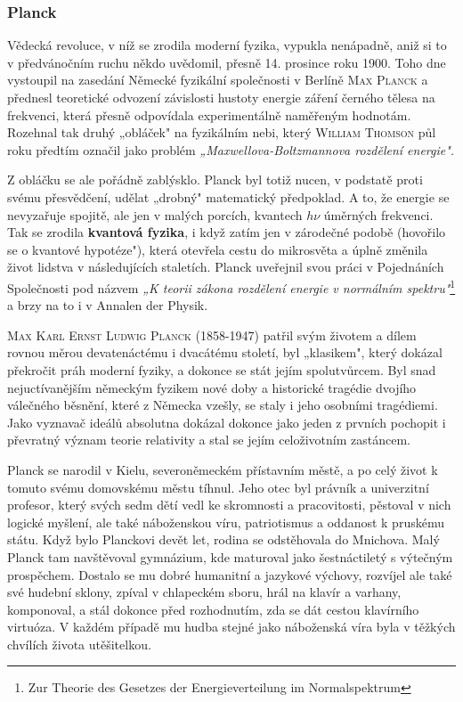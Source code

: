       \subsubsection{Planck}\label{fyz:IchapIIsecIVssecIsssecVI}
        Vědecká revoluce, v níž se zrodila moderní fyzika, vypukla nenápadně, aniž si to v
        předvánočním ruchu někdo uvědomil, přesně 14. prosince roku 1900. Toho dne vystoupil na
        zasedání Německé fyzikální společnosti v Berlíně \textsc{Max Planck} a přednesl teoretické
        odvození závislosti hustoty energie záření černého tělesa na frekvenci, která přesně
        odpovídala experimentálně naměřeným hodnotám. Rozehnal tak druhý „obláček" na fyzikálním
        nebi, který \textsc{William Thomson} půl roku předtím označil jako problém
        \emph{„Maxwellova-Boltzmannova rozdělení energie".}

        Z obláčku se ale pořádně zablýsklo. Planck byl totiž nucen, v podstatě proti svému
        přesvědčení, udělat „drobný" matematický předpoklad. A to, že energie se nevyzařuje spojitě,
        ale jen v malých porcích, kvantech \(h\nu\) úměrných frekvenci. Tak se zrodila
        \textbf{kvantová fyzika}, i když zatím jen v zárodečné podobě (hovořilo se o kvantové
        hypotéze"), která otevřela cestu do mikrosvěta a úplně změnila život lidstva v následujících
        staletích. Planck uveřejnil svou práci v Pojednáních Společnosti pod názvem \emph{„K teorii
        zákona rozdělení energie v normálním spektru"}\footnote{\foreignlanguage{ngerman}{Zur
        Theorie des Gesetzes der Energieverteilung im Normalspektrum}} a brzy na to i v Annalen der
        Physik.

        \textsc{Max Karl Ernst Ludwig Planck} (1858-1947) patřil svým životem a dílem rovnou měrou
        devatenáctému i dvacátému století, byl „klasikem", který dokázal překročit práh moderní
        fyziky, a dokonce se stát jejím spolutvůrcem. Byl snad nejuctívanějším německým fyzikem nové
        doby a historické tragédie dvojího válečného běsnění, které z Německa vzešly, se staly i
        jeho osobními tragédiemi. Jako vyznavač ideálů absolutna dokázal dokonce jako jeden z
        prvních pochopit i převratný význam teorie relativity a stal se jejím celoživotním
        zastáncem.

        Planck se narodil v Kielu, severoněmeckém přístavním městě, a po celý život k tomuto svému
        domovskému městu tíhnul. Jeho otec byl právník a univerzitní profesor, který svých sedm dětí
        vedl ke skromnosti a pracovitosti, pěstoval v nich logické myšlení, ale také náboženskou
        víru, patriotismus a oddanost k pruskému státu. Když bylo Planckovi devět let, rodina se
        odstěhovala do Mnichova. Malý Planck tam navštěvoval gymnázium, kde maturoval jako
        šestnáctiletý s výtečným prospěchem. Dostalo se mu dobré humanitní a jazykové výchovy,
        rozvíjel ale také své hudební sklony, zpíval v chlapeckém sboru, hrál na klavír a varhany,
        komponoval, a stál dokonce před rozhodnutím, zda se dát cestou klavírního virtuóza. V každém
        případě mu hudba stejné jako náboženská víra byla v těžkých chvílích života utěšitelkou.

